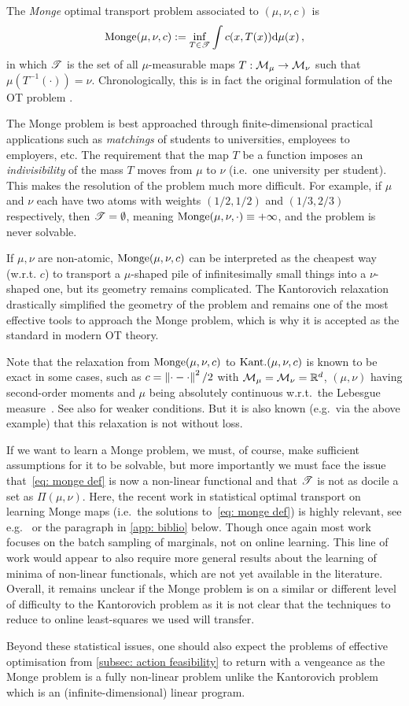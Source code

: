 The \emph{Monge} optimal transport problem associated to $(\mu,\nu,c)$ is
\begin{align}
    \text{Monge}(\mu,\nu,c):= \inf_{T\in\mathscr{T}} \int c(x,T(x))\mathrm{d}\mu(x)\,,
    \label{eq: monge def}
\end{align}
in which $\mathscr{T}$ is the set of all $\mu$-measurable maps  $T:\mathcal{M}_\mu\to\mathcal{M}_\nu$ such that $\mu(T^{-1}(\cdot))=\nu$. Chronologically, this is in fact the original formulation of the OT problem \citep{monge1781memoire}. 

The Monge problem is best approached through finite-dimensional practical applications such as \emph{matchings} of students to universities, employees to employers, etc. The requirement that the map $T$ be a function imposes an \emph{indivisibility} of the mass $T$ moves from $\mu$ to $\nu$ (i.e.\ one university per student). This makes the resolution of the problem much more difficult. For example, if $\mu$ and $\nu$ each have two atoms with weights $(1/2,1/2)$ and $(1/3,2/3)$ respectively, then $\mathscr{T}=\emptyset$, meaning $\text{Monge}(\mu,\nu,\cdot)\equiv +\infty$, and the problem is never solvable. 

If $\mu,\nu$ are non-atomic, $\text{Monge}(\mu,\nu,c)$ can be interpreted as the cheapest way (w.r.t. $c$) to transport a $\mu$-shaped pile of infinitesimally small things into a $\nu$-shaped one, but its geometry remains complicated. 
The Kantorovich relaxation drastically simplified the geometry of the problem and remains one of the most effective tools to approach the Monge problem, which is why it is accepted as the standard in modern OT theory.

Note that the relaxation from $\text{Monge}(\mu,\nu,c)$ to $\text{Kant.}(\mu,\nu,c)$ is known to be exact in some cases, such as $c=\left\lVert\cdot-\cdot\right\rVert^2/2$ with $\mathcal{M}_\mu=\mathcal{M}_\nu=\mathbb{R}^d$, $(\mu,\nu)$ having second-order moments and $\mu$ being absolutely continuous w.r.t.\ the Lebesgue measure~\cite[Thm.~5.2]{ambrosio_lectures_2021}. See also \citep[Thm.~5.30]{villani_optimal_2009} for weaker conditions. 
But it is also known (e.g.\ via the above example) that this  relaxation is not without loss.

If we want to learn a Monge problem, we must, of course, make sufficient assumptions for it to be solvable, but more importantly we must face the issue that~\eqref{eq: monge def} is now a non-linear functional and that $\mathscr{T}$ is not as docile a set as $\Pi(\mu,\nu)$. Here, the recent work in statistical optimal transport on learning Monge maps (i.e.\ the solutions to~\eqref{eq: monge def}) is highly relevant, see e.g.~\cite[Ch.~3]{chewi_statistical_2024} or the paragraph in \cref{app: biblio} below. Though once again most work focuses on the batch sampling of marginals, not on online learning. This line of work would appear to also require more general results about the learning of minima of non-linear functionals, which are not yet available in the literature. Overall, it remains unclear if the Monge problem is on a similar or different level of difficulty to the Kantorovich problem as it is not clear that the techniques to reduce to online least-squares we used will transfer. 

Beyond these statistical issues, one should also expect the problems of effective optimisation from \cref{subsec: action feasibility} to return with a vengeance as the Monge problem is a fully non-linear problem unlike the Kantorovich problem which is an (infinite-dimensional) linear program.

